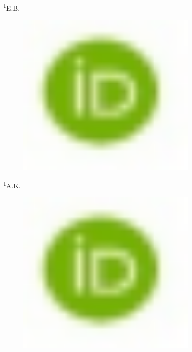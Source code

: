 \textsuperscript{1}E.B.
\begin{figure}[H]
	\centering
	\includegraphics[width=0.8\textwidth]{media/chem2/image16}
	\caption*{}
\end{figure}

\textsuperscript{1}A.K.
\begin{figure}[H]
	\centering
	\includegraphics[width=0.8\textwidth]{media/chem2/image16}
	\caption*{}
\end{figure}

